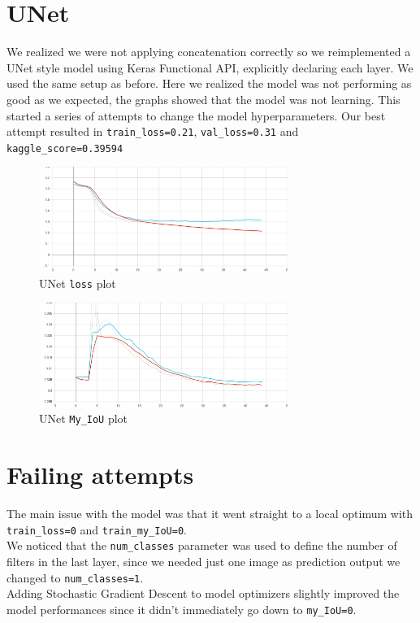 \documentclass{article}
\begin{document}
	\section{UNet}
	
		We realized we were not applying concatenation correctly so we reimplemented a UNet style model using Keras Functional  API, explicitly declaring each layer. We used the same setup as before.  Here we realized the model was not performing as good as we expected, the graphs showed that the model was not learning.
		This started a series of attempts to change the model hyperparameters. 
		Our best attempt resulted in \texttt{train\_loss=0.21}, \texttt{val\_loss=0.31} and \texttt{kaggle\_score=0.39594} 
		
		\begin{figure}[H]
			\centering
			\includegraphics[height=3.4cm, keepaspectratio]{U-Net_conc_Dec07_14-23-41_epoch_loss.jpg}
			\caption{UNet \texttt{loss} plot}
		\end{figure}
	
		\begin{figure}[H]
			\centering
			\includegraphics[height=3.4cm, keepaspectratio]{U-Net_conc_Dec07_14-23-41_epoch_my_IoU.jpg}
			\caption{UNet \texttt{My\_IoU} plot}
		\end{figure}
			
	\section{Failing attempts}
		
		The main issue with the model was that it went straight to a local optimum with \texttt{train\_loss=0} and \texttt{train\_my\_IoU=0}. \\
    	We noticed that the \texttt{num\_classes} parameter was used to define the number of filters in the last layer, since we needed just one image as prediction output we changed to \texttt{num\_classes=1}. \\
    	Adding Stochastic Gradient Descent to model optimizers slightly improved the model performances since it didn't immediately go down to \texttt{my\_IoU=0}.
	
\end{document}
